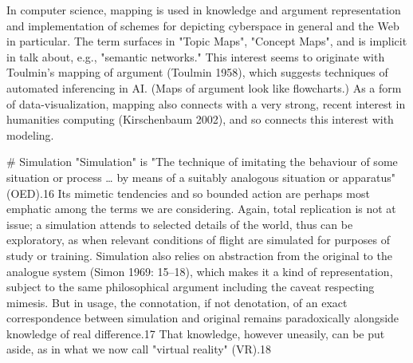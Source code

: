 In computer science, mapping is used in knowledge and argument representation and implementation of schemes for depicting cyberspace in general and the Web in particular. The term surfaces in "Topic Maps", "Concept Maps", and is implicit in talk about, e.g., "semantic networks." This interest seems to originate with Toulmin's mapping of argument (Toulmin 1958), which suggests techniques of automated inferencing in AI. (Maps of argument look like flowcharts.) As a form of data-visualization, mapping also connects with a very strong, recent interest in humanities computing (Kirschenbaum 2002), and so connects this interest with modeling.

# Simulation
"Simulation" is "The technique of imitating the behaviour of some situation or process … by means of a suitably analogous situation or apparatus" (OED).16 Its mimetic tendencies and so bounded action are perhaps most emphatic among the terms we are considering. Again, total replication is not at issue; a simulation attends to selected details of the world, thus can be exploratory, as when relevant conditions of flight are simulated for purposes of study or training. Simulation also relies on abstraction from the original to the analogue system (Simon 1969: 15–18), which makes it a kind of representation, subject to the same philosophical argument including the caveat respecting mimesis. But in usage, the connotation, if not denotation, of an exact correspondence between simulation and original remains paradoxically alongside knowledge of real difference.17 That knowledge, however uneasily, can be put aside, as in what we now call "virtual reality" (VR).18

